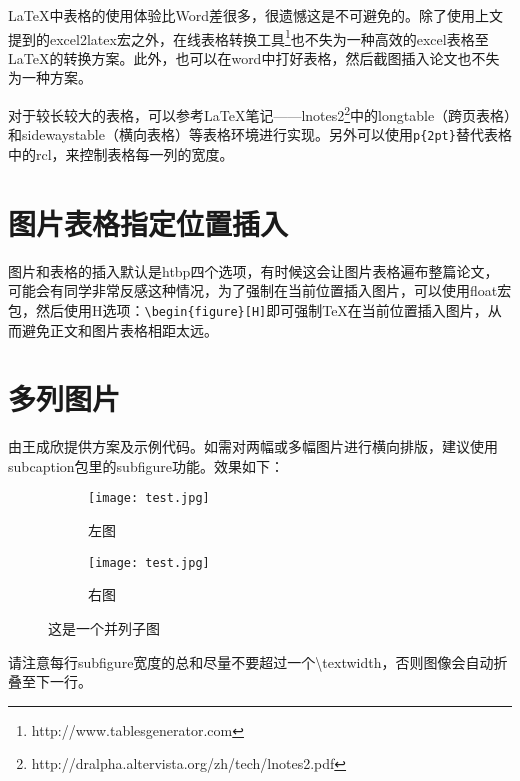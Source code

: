 \LaTeX 中表格的使用体验比Word差很多，很遗憾这是不可避免的。除了使用上文提到的excel2latex宏之外，在线表格转换工具\footnote{http://www.tablesgenerator.com}也不失为一种高效的excel表格至\LaTeX 的转换方案。此外，也可以在word中打好表格，然后截图插入论文也不失为一种方案。

对于较长较大的表格，可以参考\LaTeX 笔记——lnotes2\footnote{\url{}http://dralpha.altervista.org/zh/tech/lnotes2.pdf}中的longtable（跨页表格）和sidewaystable（横向表格）等表格环境进行实现。另外可以使用\verb!p{2pt}!替代表格中的rcl，来控制表格每一列的宽度。

\section{图片表格指定位置插入}

图片和表格的插入默认是htbp四个选项，有时候这会让图片表格遍布整篇论文，可能会有同学非常反感这种情况，为了强制在当前位置插入图片，可以使用float宏包，然后使用H选项：\verb+\begin{figure}[H]+即可强制\TeX 在当前位置插入图片，从而避免正文和图片表格相距太远。

\section{多列图片}
由王成欣提供方案及示例代码。如需对两幅或多幅图片进行横向排版，建议使用subcaption包里的subfigure功能。效果如下：

\begin{figure}[H]
\centering
\begin{subfigure}{.45\textwidth}
  \centering
  \texttt{[image: test.jpg]}
  \caption{左图}
  \label{fig:test_subfigure1}
\end{subfigure}
\begin{subfigure}{.45\textwidth}
  \centering
  \texttt{[image: test.jpg]}
  \caption{右图}
  \label{fig:test_subfigure2}
\end{subfigure}
\caption{这是一个并列子图}
\label{fig:test_subfigure}
\end{figure}

请注意每行subfigure宽度的总和尽量不要超过一个\textbackslash textwidth，否则图像会自动折叠至下一行。
